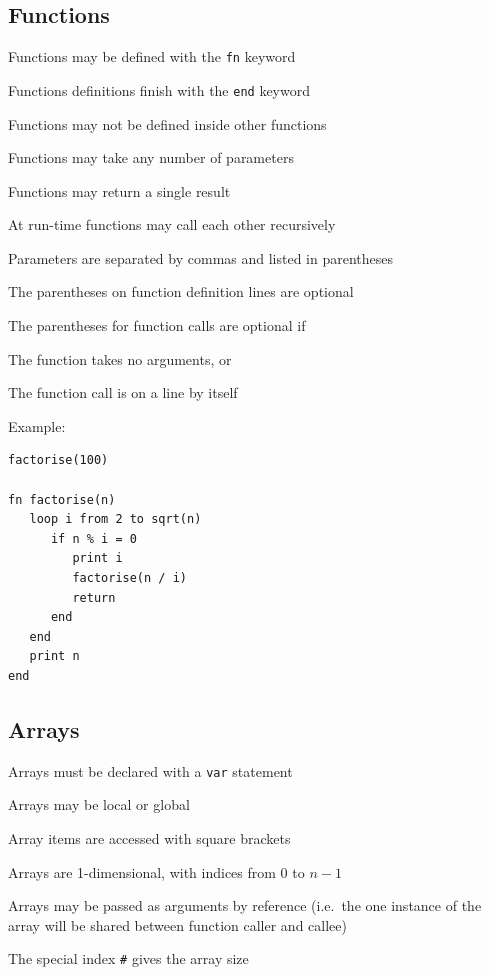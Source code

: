 \documentclass[12pt,a4paper,twoside]{article}
\renewcommand{\_}{\texttt{\symbol{95}}}
\begin{document}
\subsection{Functions}

\begin{bulletlist}
\item Functions may be defined with the \verb^fn^ keyword
\item Functions definitions finish with the \verb^end^ keyword
\item Functions may not be defined inside other functions
\item Functions may take any number of parameters
\item Functions may return a single result
\item At run-time functions may call each other recursively
\item Parameters are separated by commas and listed in parentheses
\item The parentheses on function definition lines are optional
\item The parentheses for function calls are optional if
	\begin{bulletlist}
	\item The function takes no arguments, or
	\item The function call is on a line by itself
	\end{bulletlist}
\end{bulletlist}

Example:
\begin{verbatim}
factorise(100)

fn factorise(n)
   loop i from 2 to sqrt(n)
      if n % i = 0
         print i
         factorise(n / i)
         return
      end
   end
   print n
end
\end{verbatim}

\subsection{Arrays}

\begin{bulletlist}
\item Arrays must be declared with a \verb^var^ statement
\item Arrays may be local or global
\item Array items are accessed with square brackets
\item Arrays are 1-dimensional, with indices from $0$ to $n - 1$
\item Arrays may be passed as arguments by reference (i.e.\ the one
  instance of the array will be shared between function caller and callee)
\item The special index \verb^#^ gives the array size
\end{bulletlist}
\end{document}
